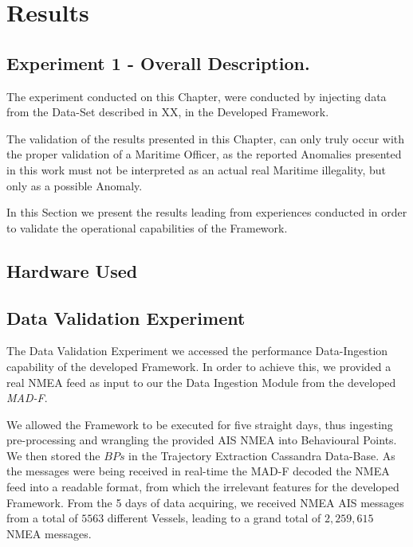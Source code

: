 \chapter{Results}
\label{chapter:Chapter 5}

\section{Experiment 1 - Overall Description.}
The experiment conducted on this Chapter, were conducted by injecting data from the Data-Set described in XX, in the Developed Framework.

The validation of the results presented in this Chapter, can only truly occur with the proper validation of a Maritime Officer, as the reported Anomalies presented in this work must not be interpreted as an actual real Maritime illegality, but only as a possible Anomaly. 

In this Section we present the results leading from experiences conducted in order to validate the operational capabilities of the Framework.

\section{Hardware Used}

\section{Data Validation Experiment}
\label{section: Experiment Data Val}
The Data Validation Experiment we accessed the performance Data-Ingestion capability of the developed Framework. In order to achieve this, we provided a real NMEA feed as input to our the Data Ingestion Module from the developed \emph{MAD-F}.

We allowed the Framework to be executed for five straight days, thus ingesting pre-processing and wrangling the provided AIS NMEA into Behavioural Points. We then stored the $BPs$ in the Trajectory Extraction Cassandra Data-Base.
As the messages were being received in real-time the MAD-F decoded the NMEA feed into a readable format, from which the irrelevant features for the developed Framework.
From the 5 days of data acquiring, we received NMEA AIS messages from a total of $5563$ different Vessels, leading to a grand total of $2,259,615$ NMEA messages.


